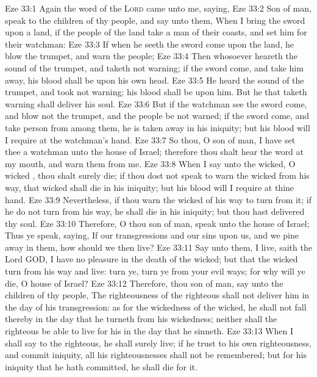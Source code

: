 \vs Eze 33:1 Again the word of the \textsc{Lord} came unto me, saying,
\vs Eze 33:2 Son of man, speak to the children of thy people, and say unto them, When I bring the sword upon a land, if the people of the land take a man of their coasts, and set him for their watchman:
\vs Eze 33:3 If when he seeth the sword come upon the land, he blow the trumpet, and warn the people;
\vs Eze 33:4 Then whosoever heareth the sound of the trumpet, and taketh not warning; if the sword come, and take him away, his blood shall be upon his own head.
\vs Eze 33:5 He heard the sound of the trumpet, and took not warning; his blood shall be upon him. But he that taketh warning shall deliver his soul.
\vs Eze 33:6 But if the watchman see the sword come, and blow not the trumpet, and the people be not warned; if the sword come, and take  person from among them, he is taken away in his iniquity; but his blood will I require at the watchman's hand.
\vs Eze 33:7 So thou, O son of man, I have set thee a watchman unto the house of Israel; therefore thou shalt hear the word at my mouth, and warn them from me.
\vs Eze 33:8 When I say unto the wicked, O wicked , thou shalt surely die; if thou dost not speak to warn the wicked from his way, that wicked  shall die in his iniquity; but his blood will I require at thine hand.
\vs Eze 33:9 Nevertheless, if thou warn the wicked of his way to turn from it; if he do not turn from his way, he shall die in his iniquity; but thou hast delivered thy soul.
\vs Eze 33:10 Therefore, O thou son of man, speak unto the house of Israel; Thus ye speak, saying, If our transgressions and our sins  upon us, and we pine away in them, how should we then live?
\vs Eze 33:11 Say unto them,  I live, saith the Lord GOD, I have no pleasure in the death of the wicked; but that the wicked turn from his way and live: turn ye, turn ye from your evil ways; for why will ye die, O house of Israel?
\vs Eze 33:12 Therefore, thou son of man, say unto the children of thy people, The righteousness of the righteous shall not deliver him in the day of his transgression: as for the wickedness of the wicked, he shall not fall thereby in the day that he turneth from his wickedness; neither shall the righteous be able to live for his  in the day that he sinneth.
\vs Eze 33:13 When I shall say to the righteous,  he shall surely live; if he trust to his own righteousness, and commit iniquity, all his righteousnesses shall not be remembered; but for his iniquity that he hath committed, he shall die for it.
